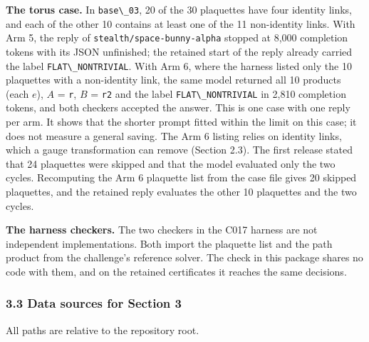\documentclass[
  11pt,
]{article}
\newcommand{\passthrough}[1]{#1}
\begin{document}
\textbf{The torus case.} In \passthrough{\lstinline!base\_03!}, 20 of
the 30 plaquettes have four identity links, and each of the other 10
contains at least one of the 11 non-identity links. With Arm 5, the
reply of \nolinkurl{stealth/space-bunny-alpha} stopped at 8,000
completion tokens with its JSON unfinished; the retained start of the
reply already carried the label
\passthrough{\lstinline!FLAT\_NONTRIVIAL!}. With Arm 6, where the
harness listed only the 10 plaquettes with a non-identity link, the same
model returned all 10 products (each \(e\)), \(A\) =
\passthrough{\lstinline!r!}, \(B\) = \passthrough{\lstinline!r2!} and
the label \passthrough{\lstinline!FLAT\_NONTRIVIAL!} in 2,810 completion
tokens, and both checkers accepted the answer. This is one case with one
reply per arm. It shows that the shorter prompt fitted within the limit
on this case; it does not measure a general saving. The Arm 6 listing
relies on identity links, which a gauge transformation can remove
(Section 2.3). The first release stated that 24 plaquettes were skipped
and that the model evaluated only the two cycles. Recomputing the Arm 6
plaquette list from the case file gives 20 skipped plaquettes, and the
retained reply evaluates the other 10 plaquettes and the two cycles.

\textbf{The harness checkers.} The two checkers in the C017 harness are
not independent implementations. Both import the plaquette list and the
path product from the challenge's reference solver. The check in this
package shares no code with them, and on the retained certificates it
reaches the same decisions.

\subsubsection{3.3 Data sources for Section
3}\label{data-sources-for-section-3}

All paths are relative to the repository root.
\end{document}
